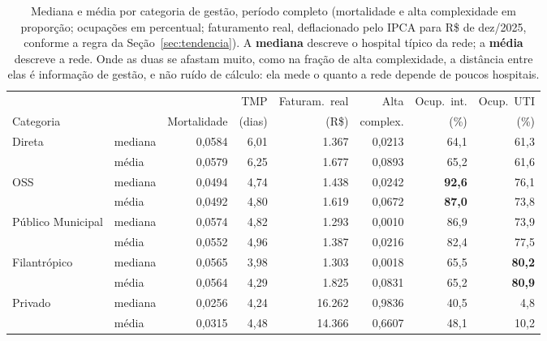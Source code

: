 \begin{table}[H]
\centering
\caption{Mediana e média por categoria de gestão, período completo
(mortalidade e alta complexidade em proporção; ocupações em percentual;
faturamento real, deflacionado pelo IPCA para R\$ de dez/2025, conforme a
regra da Seção~\ref{sec:tendencia}). A \textbf{mediana} descreve o hospital
típico da rede; a \textbf{média} descreve a rede. Onde as duas se afastam
muito, como na fração de alta complexidade, a distância entre elas é
informação de gestão, e não ruído de cálculo: ela mede o quanto a rede
depende de poucos hospitais.}
\label{tab:categorias}
\small
\setlength{\tabcolsep}{5pt}
\begin{tabular}{llrrrrrr}
\toprule
 & & & TMP & Faturam.\ real & Alta & Ocup.\ int. & Ocup.\ UTI \\
Categoria & & Mortalidade & (dias) & (R\$) & complex. & (\%) & (\%) \\
\midrule
Direta            & mediana & 0,0584 & 6,01 & 1.367 & 0,0213 & 64,1 & 61,3 \\
                  & média   & 0,0579 & 6,25 & 1.677 & 0,0893 & 65,2 & 61,6 \\
\addlinespace
OSS               & mediana & 0,0494 & 4,74 & 1.438 & 0,0242 & \textbf{92,6} & 76,1 \\
                  & média   & 0,0492 & 4,80 & 1.619 & 0,0672 & \textbf{87,0} & 73,8 \\
\addlinespace
Público Municipal & mediana & 0,0574 & 4,82 & 1.293 & 0,0010 & 86,9 & 73,9 \\
                  & média   & 0,0552 & 4,96 & 1.387 & 0,0216 & 82,4 & 77,5 \\
\addlinespace
Filantrópico      & mediana & 0,0565 & 3,98 & 1.303 & 0,0018 & 65,5 & \textbf{80,2} \\
                  & média   & 0,0564 & 4,29 & 1.825 & 0,0831 & 65,2 & \textbf{80,9} \\
\addlinespace
Privado           & mediana & 0,0256 & 4,24 & 16.262 & 0,9836 & 40,5 & 4,8 \\
                  & média   & 0,0315 & 4,48 & 14.366 & 0,6607 & 48,1 & 10,2 \\
\bottomrule
\end{tabular}
\end{table}



